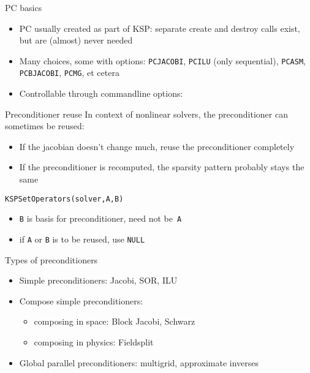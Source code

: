 \begin{numberedframe}{PC basics}
  \begin{itemize}
  \item PC usually created as part of KSP: separate create and destroy
    calls exist, but are (almost) never needed
  \item Many choices, some with options: \lstinline{PCJACOBI}, \lstinline{PCILU} (only
    sequential), \lstinline{PCASM}, \lstinline{PCBJACOBI}, \lstinline{PCMG}, et cetera
  \item Controllable through commandline options:\\
  \end{itemize}
\end{numberedframe}

\begin{numberedframe}{Preconditioner reuse}
In context of nonlinear solvers, the preconditioner can sometimes be reused:
\begin{itemize}
\item If the jacobian doesn't change much, reuse the preconditioner completely
\item If the preconditioner is recomputed, the sparsity pattern 
  probably stays the same
\end{itemize}
\lstinline{KSPSetOperators(solver,A,B)}
    \begin{itemize}
    \item \lstinline{B} is basis for preconditioner, need not be~\lstinline{A}
    \item if \lstinline{A} or \lstinline{B} is to be reused, use \lstinline{NULL}
    \end{itemize}
\end{numberedframe}

\begin{numberedframe}{Types of preconditioners}
  \begin{itemize}
  \item Simple preconditioners: Jacobi, SOR, ILU
  \item Compose simple preconditioners:
    \begin{itemize}
    \item composing in space: Block Jacobi, Schwarz
    \item composing in physics: Fieldsplit
    \end{itemize}
  \item Global parallel preconditioners: multigrid, approximate
    inverses
  \end{itemize}
\end{numberedframe}

